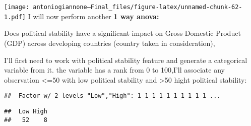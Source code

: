 \documentclass[
]{article}
\newenvironment{Shaded}{\begin{snugshade}}{\end{snugshade}}
\newcommand{\AttributeTok}[1]{\textcolor[rgb]{0.13,0.29,0.53}{#1}}
\newcommand{\DecValTok}[1]{\textcolor[rgb]{0.00,0.00,0.81}{#1}}
\newcommand{\FunctionTok}[1]{\textcolor[rgb]{0.13,0.29,0.53}{\textbf{#1}}}
\newcommand{\NormalTok}[1]{#1}
\newcommand{\OtherTok}[1]{\textcolor[rgb]{0.56,0.35,0.01}{#1}}
\newcommand{\SpecialCharTok}[1]{\textcolor[rgb]{0.81,0.36,0.00}{\textbf{#1}}}
\newcommand{\StringTok}[1]{\textcolor[rgb]{0.31,0.60,0.02}{#1}}
\begin{document}
\texttt{[image: antoniogiannone---Final\_files/figure-latex/unnamed-chunk-62-1.pdf]}
I will now perform another \textbf{1 way anova:}

Does political stability have a significant impact on Gross Domestic
Product (GDP) across developing countries (country taken in
consideration),

I'll first need to work with political stability feature and generate a
categorical variable from it. the variable has a rank from 0 to 100,I'll
associate any observation \textless=50 with low political stability and
\textgreater50 hight political stability:

\begin{Shaded}
\end{Shaded}

\begin{verbatim}
##  Factor w/ 2 levels "Low","High": 1 1 1 1 1 1 1 1 1 1 ...
\end{verbatim}

\begin{Shaded}
\end{Shaded}

\begin{verbatim}
##  Low High 
##   52    8
\end{verbatim}

\begin{Shaded}
\end{Shaded}
\end{document}
